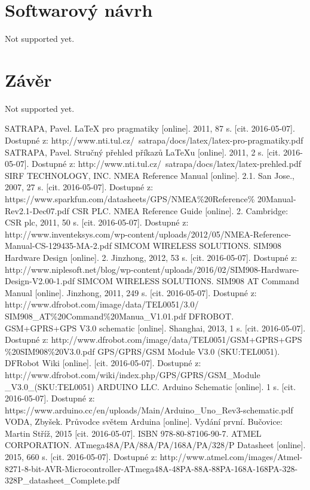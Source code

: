 \documentclass[FM,BP]{tulthesis}  %
\begin{document}

\chapter{Softwarový návrh}
Not supported yet.


\chapter{Závěr}
Not supported yet.

\begin{thebibliography}{References}
SATRAPA, Pavel. LaTeX pro pragmatiky [online]. 2011, 87 s. [cit. 2016-05-07]. Dostupné z: http://www.nti.tul.cz/~satrapa/docs/latex/latex-pro-pragmatiky.pdf
SATRAPA, Pavel. Stručný přehled příkazů LaTeXu [online]. 2011, 2 s. [cit. 2016-05-07]. Dostupné z: http://www.nti.tul.cz/~satrapa/docs/latex/latex-prehled.pdf
SIRF TECHNOLOGY, INC. NMEA Reference Manual [online]. 2.1. San Jose., 2007, 27 s. [cit. 2016-05-07]. Dostupné z: https://www.sparkfun.com/datasheets/GPS/NMEA\%20Reference\% 20Manual-Rev2.1-Dec07.pdf
CSR PLC. NMEA Reference Guide [online]. 2. Cambridge: CSR plc, 2011, 50 s. [cit. 2016-05-07]. Dostupné z: http://www.inventeksys.com/wp-content/uploads/2012/05/NMEA-Reference-Manual-CS-129435-MA-2.pdf
SIMCOM WIRELESS SOLUTIONS. SIM908 Hardware Design [online]. 2. Jinzhong, 2012, 53 s. [cit. 2016-05-07]. Dostupné z: http://www.niplesoft.net/blog/wp-content/uploads/2016/02/SIM908-Hardware-Design-V2.00-1.pdf
SIMCOM WIRELESS SOLUTIONS. SIM908 AT Command Manual [online]. Jinzhong, 2011, 249 s. [cit. 2016-05-07]. Dostupné z: http://www.dfrobot.com/image/data/TEL0051/3.0/ SIM908\_AT\%20Command\%20Manua\_V1.01.pdf
DFROBOT. GSM+GPRS+GPS V3.0 schematic [online]. Shanghai, 2013, 1 s. [cit. 2016-05-07]. Dostupné z: http://www.dfrobot.com/image/data/TEL0051/GSM+GPRS+GPS \%20SIM908\%20V3.0.pdf
GPS/GPRS/GSM Module V3.0 (SKU:TEL0051). DFRobot Wiki [online]. [cit. 2016-05-07]. Dostupné z: http://www.dfrobot.com/wiki/index.php/GPS/GPRS/GSM\_Module \_V3.0\_(SKU:TEL0051)
ARDUINO LLC. Arduino Schematic [online]. 1 s. [cit. 2016-05-07]. Dostupné z: https://www.arduino.cc/en/uploads/Main/Arduino\_Uno\_Rev3-schematic.pdf
VODA, Zbyšek. Průvodce světem Arduina [online]. Vydání první. Bučovice: Martin Stříž, 2015 [cit. 2016-05-07]. ISBN 978-80-87106-90-7.
ATMEL CORPORATION. ATmega48A/PA/88A/PA/168A/PA/328/P Datasheet [online]. 2015, 660 s. [cit. 2016-05-07]. Dostupné z: http://www.atmel.com/images/Atmel-8271-8-bit-AVR-Microcontroller-ATmega48A-48PA-88A-88PA-168A-168PA-328-328P\_datasheet\_Complete.pdf


\end{thebibliography}
\end{document}
